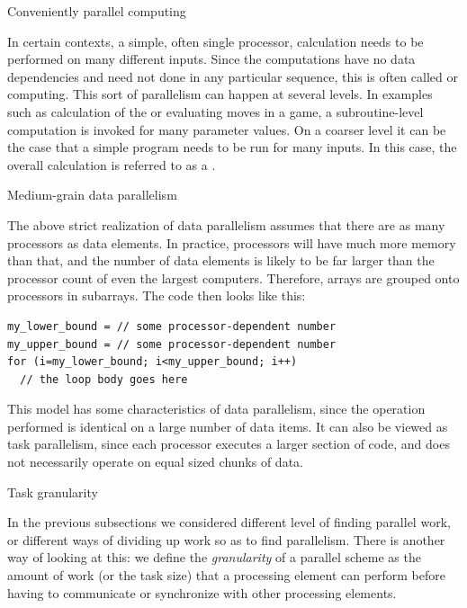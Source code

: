 
 {Conveniently parallel computing}

In certain contexts, a simple, often single processor, calculation needs to
be performed on many different inputs.
%
Since the computations have no data dependencies and
need not done in any particular sequence, this is often called
 or  computing.
%
This sort of parallelism can happen at several levels. In examples
such as calculation of the  or evaluating
moves in a  game, a subroutine-level computation is
invoked for many parameter values.
% 
On a coarser level it can be the case that a simple program needs to
be run for many inputs. In this case, the overall calculation
is referred to as a . 

 {Medium-grain data parallelism}
\label{sec:medium-grain}

The above strict realization of data parallelism assumes that there
are as many processors as data elements. In practice, processors will
have much more memory than that, and the number of data elements is
likely to be far larger than the processor count of even the largest
computers. Therefore, arrays are grouped onto processors in subarrays.
The code then looks like this:
\begin{verbatim}
my_lower_bound = // some processor-dependent number
my_upper_bound = // some processor-dependent number
for (i=my_lower_bound; i<my_upper_bound; i++)
  // the loop body goes here
\end{verbatim}

This model has some characteristics of data parallelism, since the
operation performed is identical on a large number of data items. It
can also be viewed as task parallelism, since each processor executes
a larger section of code, and does not necessarily operate on equal
sized chunks of data.

 {Task granularity}

In the previous subsections we considered different level of finding
parallel work, or different ways of dividing up work so as to find
parallelism. There is another way of looking at this: we define
the \emph{granularity} of a parallel scheme as the amount of work (or
the task size) that a processing element can perform before having to
communicate or synchronize with other processing elements.

